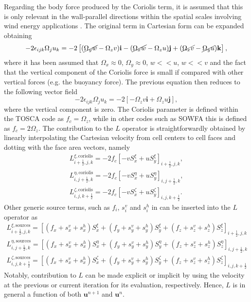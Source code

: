 Regarding the body force produced by the Coriolis term, it is assumed that this is only relevant in the wall-parallel directions within the spatial scales involving wind energy applications \citep{Gill1982_C4}. The original term in Cartesian form  can be expanded obtaining
\begin{equation}
	-2\epsilon_{ijk}\Omega_ju_k = -2\left[(\cancel{\Omega_yw}-\Omega_zv)\mathbf{i} - (\cancel{\Omega_xw}-\Omega_zu)\mathbf{j} + (\cancel{\Omega_xv}-\cancel{\Omega_yu})\mathbf{k}\right], \label{eq:coriolisFullCartesian}
\end{equation}
where it has been assumed that $\Omega_x\approx0$, $\Omega_y\approx0$, $w<<u$, $w<<v$ and the fact that the vertical component of the Coriolis force is small if compared with other vertical forces (e.g. the buoyancy force). The previous equation then reduces to the following vector field
\begin{equation}
	-2\epsilon_{ijk}\Omega_ju_k = -2 \left[-\Omega_zv\mathbf{i} + \Omega_zu\mathbf{j}\right], \label{eq:coriolisApproxCartesian}
\end{equation}
where the vertical component is zero. The Coriolis parameter is defined within the TOSCA code as $f_c=\Omega_z$, while in other codes such as SOWFA this is defined as $f_c=2\Omega_z$. The contribution to the $L$ operator is straightforwardly obtained by linearly interpolating the Cartesian velocity from cell centers to cell faces and dotting  with the face area vectors, namely
\begin{align}
	L^{\xi,\text{coriolis}}_{i+\frac{1}{2},j,k} = -2f_c\left[-vS_x^\xi + uS_y^\xi\right]_{i+\frac{1}{2},j,k}, \label{eq:coriolisCsi} \\
	L^{\eta,\text{coriolis}}_{i,j+\frac{1}{2},k} = -2f_c\left[-vS_x^\eta + uS_y^\eta\right]_{i,j+\frac{1}{2},k}, \label{eq:coriolisEta} \\
	L^{\zeta,\text{coriolis}}_{i,j,k+\frac{1}{2}} = -2f_c\left[-vS_x^\zeta + uS_y^\zeta\right]_{i,j,k+\frac{1}{2}}. \label{eq:coriolisZet} 
\end{align}
Other generic source terms, such as $f_i$, $s_i^v$ and $s_i^h$ in  can be inserted into the $L$ operator as
\begin{align}
	L^{\xi,\text{sources}}_{i+\frac{1}{2},j,k} = \left[(f_x + s_x^v + s_x^h)S_x^\xi + (f_y + s_y^v + s_y^h)S_y^\xi + (f_z + s_z^v + s_z^h)S_z^\xi\right]_{i+\frac{1}{2},j,k} \label{eq:sourcesCsi} \\
	L^{\eta,\text{sources}}_{i,j+\frac{1}{2},k} = \left[(f_x + s_x^v + s_x^h)S_x^\eta + (f_y + s_y^v + s_y^h)S_y^\eta + (f_z + s_z^v + s_z^h)S_z^\eta\right]_{i,j+\frac{1}{2},k} \label{eq:sourcesEta} \\
	L^{\zeta,\text{sources}}_{i,j,k+\frac{1}{2}} = \left[(f_x + s_x^v + s_x^h)S_x^\zeta + (f_y + s_y^v + s_y^h)S_y^\zeta + (f_z + s_z^v + s_z^h)S_z^\zeta\right]_{i,j,k+\frac{1}{2}} \label{eq:sourcesZet}
\end{align} 
Notably, contribution to $L$ can be made explicit or implicit by using the velocity at the previous or current iteration for its evaluation, respectively. Hence, $L$ is in general a function of both $\mathbf{u}^{n+1}$ and $\mathbf{u}^n$. 

